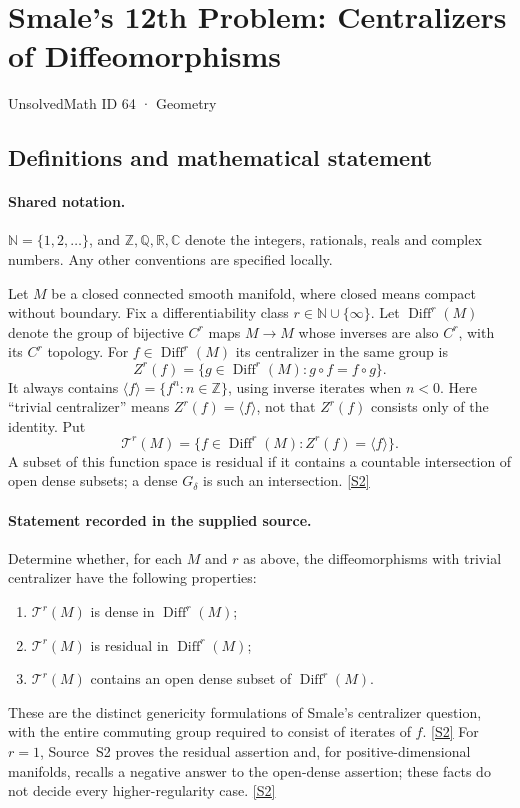 \documentclass[11pt]{article}
\newcommand{\sref}[2]{\hyperlink{source:#1:#2}{[S#2]}}
\begin{document}
\setcounter{section}{63}
\section{Smale's 12th Problem: Centralizers of Diffeomorphisms}\label{64}
{\small\sffamily UnsolvedMath ID 64 · Geometry}
\subsection{Definitions and mathematical statement}

\paragraph{Shared notation.}$\mathbb N=\{1,2,\ldots\}$, and $\mathbb Z,\mathbb Q,\mathbb R,\mathbb C$ denote the integers, rationals, reals and complex numbers. Any other conventions are specified locally.


Let $M$ be a closed connected smooth manifold, where closed means compact without boundary. Fix a differentiability class $r\in\mathbb N\cup\{\infty\}$. Let $\operatorname{Diff}^r(M)$ denote the group of bijective $C^r$ maps $M\to M$ whose inverses are also $C^r$, with its $C^r$ topology. For $f\in\operatorname{Diff}^r(M)$ its centralizer in the same group is
\[
 Z^r(f)=\{g\in\operatorname{Diff}^r(M):g\circ f=f\circ g\}.
\]
It always contains $\langle f\rangle=\{f^n:n\in\mathbb Z\}$, using inverse iterates when $n<0$. Here ``trivial centralizer'' means $Z^r(f)=\langle f\rangle$, not that $Z^r(f)$ consists only of the identity. Put
\[
 \mathcal T^r(M)=\{f\in\operatorname{Diff}^r(M):Z^r(f)=\langle f\rangle\}.
\]
A subset of this function space is residual if it contains a countable intersection of open dense subsets; a dense $G_\delta$ is such an intersection. \sref{64}{2}
\paragraph{Statement recorded in the supplied source.}
Determine whether, for each $M$ and $r$ as above, the diffeomorphisms with trivial centralizer have the following properties:
\begin{enumerate}
\item $\mathcal T^r(M)$ is dense in $\operatorname{Diff}^r(M)$;
\item $\mathcal T^r(M)$ is residual in $\operatorname{Diff}^r(M)$;
\item $\mathcal T^r(M)$ contains an open dense subset of $\operatorname{Diff}^r(M)$.
\end{enumerate}
These are the distinct genericity formulations of Smale's centralizer question, with the entire commuting group required to consist of iterates of $f$. \sref{64}{2}
For $r=1$, Source~S2 proves the residual assertion and, for positive-dimensional manifolds, recalls a negative answer to the open-dense assertion; these facts do not decide every higher-regularity case. \sref{64}{2}
\end{document}
